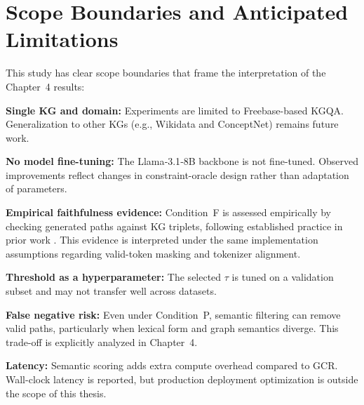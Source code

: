 \section{Scope Boundaries and Anticipated Limitations}
\label{sec:ch3limitations}

This study has clear scope boundaries that frame the interpretation of the Chapter~4 results:

\textbf{Single KG and domain:} Experiments are limited to Freebase-based KGQA. Generalization to other KGs (e.g., Wikidata and ConceptNet) remains future work.

\textbf{No model fine-tuning:} The Llama‑3.1‑8B backbone is not fine-tuned. Observed improvements reflect changes in constraint-oracle design rather than adaptation of parameters.

\textbf{Empirical faithfulness evidence:} Condition~F is assessed empirically by checking generated paths against KG triplets, following established practice in prior work \citep{luo2025-graph-constrained-reasoning, li2024-decoding-on-graphs}. This evidence is interpreted under the same implementation assumptions regarding valid-token masking and tokenizer alignment.

\textbf{Threshold as a hyperparameter:} The selected $\tau$ is tuned on a validation subset and may not transfer well across datasets.

\textbf{False negative risk:} Even under Condition~P, semantic filtering can remove valid paths, particularly when lexical form and graph semantics diverge. This trade-off is explicitly analyzed in Chapter~4.

\textbf{Latency:} Semantic scoring adds extra compute overhead compared to GCR. Wall-clock latency is reported, but production deployment optimization is outside the scope of this thesis.